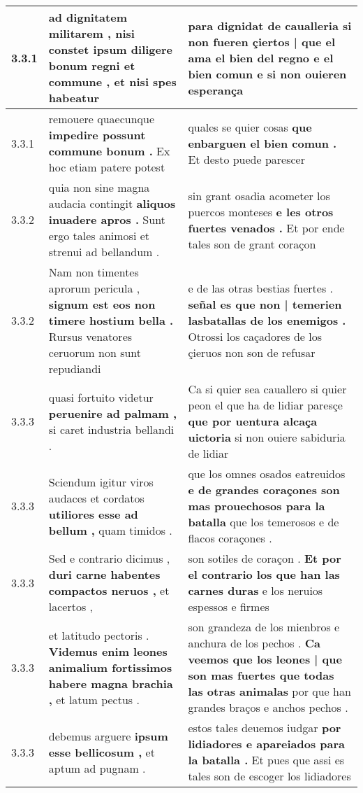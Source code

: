 \begin{tabular}{|p{1cm}|p{6.5cm}|p{6.5cm}|}
3.3.1 & ad dignitatem militarem , \textbf{ nisi constet ipsum diligere bonum regni et commune , } et nisi spes habeatur & para dignidat de caualleria \textbf{ si non fueren çiertos | que el ama el bien del regno e el bien comun } e si non ouieren esperança \\\hline
3.3.1 & remouere quaecunque \textbf{ impedire possunt commune bonum . } Ex hoc etiam patere potest & quales se quier cosas \textbf{ que enbarguen el bien comun . } Et desto puede parescer \\\hline
3.3.2 & quia non sine magna audacia contingit \textbf{ aliquos inuadere apros . } Sunt ergo tales animosi et strenui ad bellandum . & sin grant osadia acometer los puercos monteses \textbf{ e les otros fuertes venados . } Et por ende tales son de grant coraçon \\\hline
3.3.2 & Nam non timentes aprorum pericula , \textbf{ signum est eos non timere hostium bella . } Rursus venatores ceruorum non sunt repudiandi & e de las otras bestias fuertes . \textbf{ señal es que non | temerien lasbatallas de los enemigos . } Otrossi los caçadores de los çieruos non son de refusar \\\hline
3.3.3 & quasi fortuito videtur \textbf{ peruenire ad palmam , } si caret industria bellandi . & Ca si quier sea cauallero si quier peon el que ha de lidiar paresçe \textbf{ que por uentura alcaça uictoria } si non ouiere sabiduria de lidiar \\\hline
3.3.3 & Sciendum igitur viros audaces et cordatos \textbf{ utiliores esse ad bellum , } quam timidos . & que los omnes osados eatreuidos \textbf{ e de grandes coraçones son mas prouechosos para la batalla } que los temerosos e de flacos coraçones . \\\hline
3.3.3 & Sed e contrario dicimus , \textbf{ duri carne habentes compactos neruos , } et lacertos , & son sotiles de coraçon . \textbf{ Et por el contrario los que han las carnes duras } e los neruios espessos e firmes \\\hline
3.3.3 & et latitudo pectoris . \textbf{ Videmus enim leones animalium fortissimos habere magna brachia , } et latum pectus . & son grandeza de los mienbros e anchura de los pechos . \textbf{ Ca veemos que los leones | que son mas fuertes que todas las otras animalas } por que han grandes braços e anchos pechos . \\\hline
3.3.3 & debemus arguere \textbf{ ipsum esse bellicosum , } et aptum ad pugnam . & estos tales deuemos iudgar \textbf{ por lidiadores e apareiados para la batalla . } Et pues que assi es tales son de escoger los lidiadores \\\hline

\end{tabular}
